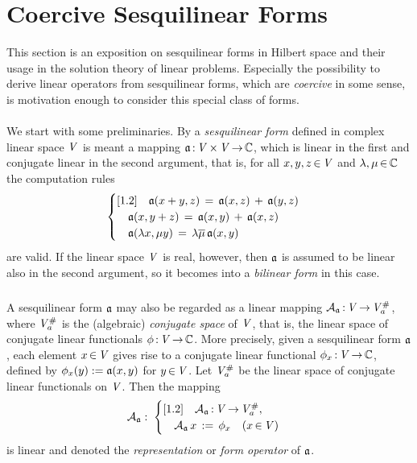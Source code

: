\documentclass[11pt,twoside]{article}
\begin{document}
\section{Coercive Sesquilinear Forms}                                          %
This section is an exposition on sesquilinear forms
in Hilbert space and their usage in the solution theory of linear problems.
Especially the possibility to derive linear operators from sesquilinear forms, 
which are \textit{coercive} in some sense,
is motivation enough to consider this special class of forms.

\paragraph{} %
We start with some preliminaries.
By a \textit{sesquilinear form} defined in complex linear space $\mathit{V}$
is meant a mapping $\mathfrak{a} {\,:\,} \mathit{V} {\,\times\,} \mathit{V} {\,\to\,} {\mathbb{C}}$,
which is linear in the first and conjugate linear in the second argument,
that is,
for all $x,y,z {\,\in\,} \mathit{V}$ and $\lambda,\mu {\,\in\,} {\mathbb{C}}$ the computation rules
\[
\begin{cases}[1.2]
\quad \mathfrak{a}(x+y,z) \,=\, \mathfrak{a}(x,z) \,+\, \mathfrak{a}(y,z) \\
\quad \mathfrak{a}(x,y+z) \,=\, \mathfrak{a}(x,y) \,+\, \mathfrak{a}(x,z) \\
\quad \mathfrak{a}(\lambda x,\mu y) \,=\, \lambda \overline{\mu} \, \mathfrak{a}(x,y) \\
\end{cases}
\]
are valid.
If the linear space $\mathit{V}$ is real, 
however,
then $\mathfrak{a}$ is assumed to be linear also in the second argument,
so it becomes into a \textit{bilinear form} in this case.

\subparagraph{} %
A sesquilinear form $\mathfrak{a}$ may also be regarded
as a linear mapping ${{\mathcal{A}}_{\mathfrak{a}}} {\,:\,} \mathit{V} {\,\to\,} \mathit{V}_a^{\#}$,
where $\mathit{V}_a^{\#}$ is the (algebraic) \textit{conjugate space} of $\mathit{V}$,
that is,
the linear space of conjugate linear functionals $\phi {\,:\,} \mathit{V} {\,\to\,} {\mathbb{C}}$.
More precisely,
given a sesquilinear form $\mathfrak{a}$,
each element $x {\,\in\,} \mathit{V}$ gives rise to a conjugate linear functional
$\phi_x {\,:\,} \mathit{V} {\,\to\,} {\mathbb{C}}$,
defined by $\phi_x(y) := \mathfrak{a}(x,y)$ for $y {\,\in\,} \mathit{V}$.
Let $\mathit{V}_a^{\#}$ be the linear space
of conjugate linear functionals on $\mathit{V}$.
Then the mapping
\[
{{\mathcal{A}}_{\mathfrak{a}}}: \;
\begin{cases}[1.2]
\quad {{\mathcal{A}}_{\mathfrak{a}}} {\,:\,} \mathit{V} {\,\to\,} \mathit{V}_a^{\#},\\
\quad {{\mathcal{A}}_{\mathfrak{a}}} \, x \,:=\, \phi_x \quad (x {\,\in\,} \mathit{V})
\end{cases}
\]
is linear and denoted the \textit{representation} or \textit{form operator}
of $\mathfrak{a}$.
\end{document}
